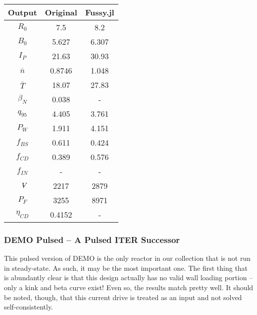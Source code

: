 \begin{table}[h!]
\begin{subtable}[t]{0.5\textwidth}
\begin{tabular}{ c|c|c }
Output           & Original         & Fussy.jl        \\  
\hline
$R_{0}$          & 7.5              & 8.2           \\
$B_{0}$          & 5.627            & 6.307           \\
$I_{P}$          & 21.63            & 30.93           \\
$\overline n$    & 0.8746           & 1.048           \\
$\overline T$    & 18.07            & 27.83           \\
$\beta_{N}$       & 0.038            & -           \\
$q_{95}$         & 4.405            & 3.761           \\
$P_{W}$          & 1.911            & 4.151           \\
$f_{BS}$         & 0.611            & 0.424          \\
$f_{CD}$         & 0.389            & 0.576          \\
$f_{IN}$         & -              & -             \\
$\volume$         & 2217           & 2879          \\
$P_{F}$          & 3255           & 8971          \\
$\eta_{CD}$      & 0.4152           & -          \\

\end{tabular}
\end{subtable}
\hfill
\hfill
\end{table}

\newpage 

\subsubsection{DEMO Pulsed -- A Pulsed ITER Successor}

This pulsed version of DEMO is the only reactor in our collection that is not run in steady-state. As such, it may be the most important one. The first thing that is abundantly clear is that this design actually has no valid wall loading portion -- only a kink and beta curve exist! Even so, the results match pretty well. It should be noted, though, that this current drive is treated as an input and not solved self-consistently.

